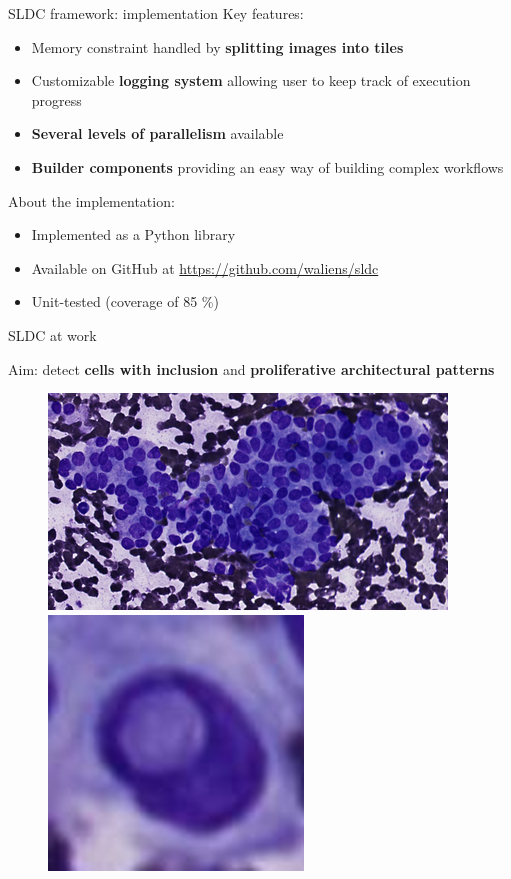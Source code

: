 \documentclass{beamer}
\begin{document}
\begin{frame}{SLDC framework: implementation}
	Key features:
	\begin{itemize}
		\item Memory constraint handled by \textbf{splitting images into tiles}
		\item Customizable \textbf{logging system} allowing user to keep track of execution progress
		\item \textbf{Several levels of parallelism} available 
		\item \textbf{Builder components} providing an easy way of building complex workflows
	\end{itemize}
	\vspace{0.5cm}
	About the implementation: 
	\begin{itemize}
		\item Implemented as a Python library
		\item Available on GitHub at {\small\url{https://github.com/waliens/sldc}}
		\item Unit-tested (coverage of 85 \%)
		\vspace{0.5cm}
	\end{itemize}
\end{frame}


\begin{frame}{SLDC at work}
	\begin{center}	
		Aim: detect \textbf{cells with inclusion} and \textbf{proliferative architectural patterns}
	\end{center}
	\begin{figure}
		\includegraphics[scale=0.55]{images/prolif_pattern_1.png}
		\hspace{1cm}
		\includegraphics[scale=0.35]{images/incl1.png}
	\end{figure}
\end{frame}
\end{document}
